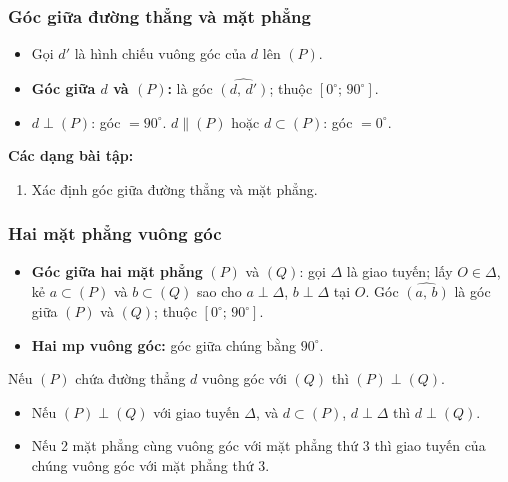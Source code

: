 \documentclass[12pt,a4paper]{article}
\begin{document}
\subsubsection{Góc giữa đường thẳng và mặt phẳng}

\begin{dinhnghia}
  \begin{itemize}
    \item Gọi $d'$ là hình chiếu vuông góc của $d$ lên $(P)$.
    \item \textbf{Góc giữa $d$ và $(P)$:} là góc $\widehat{(d,\, d')}$; thuộc $[0^\circ;\, 90^\circ]$.
    \item $d \perp (P)$: góc $= 90^\circ$. \quad $d \parallel (P)$ hoặc $d \subset (P)$: góc $= 0^\circ$.
  \end{itemize}
\end{dinhnghia}

\medskip\noindent\textbf{Các dạng bài tập:}
\begin{enumerate}[label=\textbf{Dạng \arabic*:}, leftmargin=*, align=left]
  \item Xác định góc giữa đường thẳng và mặt phẳng.
\end{enumerate}

\subsubsection{Hai mặt phẳng vuông góc}

\begin{dinhnghia}
  \begin{itemize}
    \item \textbf{Góc giữa hai mặt phẳng} $(P)$ và $(Q)$: gọi $\Delta$ là giao tuyến; lấy $O \in \Delta$, kẻ $a \subset (P)$ và $b \subset (Q)$ sao cho $a \perp \Delta$, $b \perp \Delta$ tại $O$. Góc $\widehat{(a,\,b)}$ là góc giữa $(P)$ và $(Q)$; thuộc $[0^\circ;\, 90^\circ]$.
    \item \textbf{Hai mp vuông góc:} góc giữa chúng bằng $90^\circ$.
  \end{itemize}
\end{dinhnghia}

\begin{dinhly}[title={Dấu hiệu nhận biết}]
  Nếu $(P)$ chứa đường thẳng $d$ vuông góc với $(Q)$ thì $(P) \perp (Q)$.
\end{dinhly}

\begin{tinhchat}
  \begin{itemize}
    \item Nếu $(P) \perp (Q)$ với giao tuyến $\Delta$, và $d \subset (P)$, $d \perp \Delta$ thì $d \perp (Q)$.
    \item Nếu 2 mặt phẳng cùng vuông góc với mặt phẳng thứ 3 thì giao tuyến của chúng vuông góc với mặt phẳng thứ 3.
  \end{itemize}
\end{tinhchat}
\end{document}
